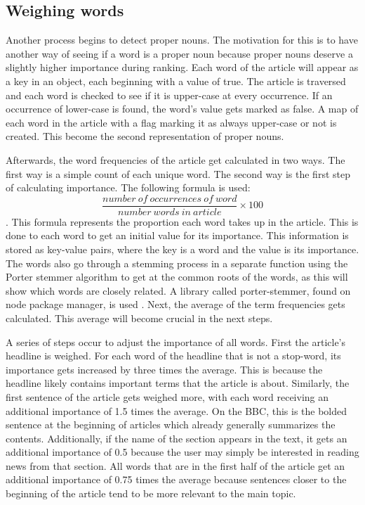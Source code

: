 \documentclass[11pt,titlepage]{report}
\begin{document}
\subsection{Weighing words}
Another process begins to detect proper nouns. The motivation for this is to have another way of seeing if a word is a proper noun because proper nouns deserve a slightly higher importance during ranking. Each word of the article will appear as a key in an object, each beginning with a value of true. The article is traversed and each word is checked to see if it is upper-case at every occurrence. If an occurrence of lower-case is found, the word's value gets marked as false. A map of each word in the article with a flag marking it as always upper-case or not is created. This become the second representation of proper nouns.

Afterwards, the word frequencies of the article get calculated in two ways. The first way is a simple count of each unique word. The second way is the first step of calculating importance. The following formula is used: \[ \frac{number \ of \ occurrences \ of \ word}{number \ words \ in \ article} \times 100 \]. This formula represents the proportion each word takes up in the article. This is done to each word to get an initial value for its importance. This information is stored as key-value pairs, where the key is a word and the value is its importance. The words also go through a stemming process in a separate function using the Porter stemmer algorithm to get at the common roots of the words, as this will show which words are closely related. A library called porter-stemmer, found on node package manager, is used \cite{porter-stemmer}. Next, the average of the term frequencies gets calculated. This average will become crucial in the next steps.

A series of steps occur to adjust the importance of all words. First the article's headline is weighed. For each word of the headline that is not a stop-word, its importance gets increased by three times the average. This is because the headline likely contains important terms that the article is about. Similarly, the first sentence of the article gets weighed more, with each word receiving an additional importance of 1.5 times the average. On the BBC, this is the bolded sentence at the beginning of articles which already generally summarizes the contents. Additionally, if the name of the section appears in the text, it gets an additional importance of 0.5 because the user may simply be interested in reading news from that section. All words that are in the first half of the article get an additional importance of 0.75 times the average because sentences closer to the beginning of the article tend to be more relevant to the main topic. 
\end{document}
